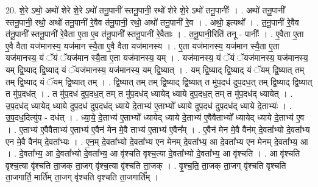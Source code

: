 \documentclass[17pt]{extarticle}
\begin{document}
20. शे॒रे ऽथो॒ अथो॑ शेरे शे॒रे ऽथो॑ तनू॒पानी᳚ स्तनू॒पानी॒ रथो॑ शेरे शे॒रे ऽथो॑ तनू॒पानीः᳚ । . अथो॑ तनू॒पानी᳚ स्तनू॒पानी॒ रथो॒ अथो॑ तनू॒पानी॑ रे॒वैव त॑नू॒पानी॒ रथो॒ अथो॑ तनू॒पानी॑ रे॒व । . अथो॒ इत्यथो᳚ । . त॒नू॒पानी॑ रे॒वैव त॑नू॒पानी᳚ स्तनू॒पानी॑ रे॒वैता ए॒ता ए॒व त॑नू॒पानी᳚ स्तनू॒पानी॑ रे॒वैताः । . त॒नू॒पानी॒रिति॑ तनू - पानीः᳚ । . ए॒वैता ए॒ता ए॒वै वैता यज॑मानस्य॒ यज॑मान स्यै॒ता ए॒वै वैता यज॑मानस्य । . ए॒ता यज॑मानस्य॒ यज॑मान स्यै॒ता ए॒ता यज॑मानस्य॒ यं ॅयं ॅयज॑मान स्यै॒ता ए॒ता यज॑मानस्य॒ यम् । . यज॑मानस्य॒ यं ॅयं ॅयज॑मानस्य॒ यज॑मानस्य॒ यम् द्वि॒ष्याद् द्वि॒ष्याद् यं ॅयज॑मानस्य॒ यज॑मानस्य॒ यम् द्वि॒ष्यात् । . यम् द्वि॒ष्याद् द्वि॒ष्याद् यं ॅयम् द्वि॒ष्यात् तम् तम् द्वि॒ष्याद् यं ॅयम् द्वि॒ष्यात् तम् । . द्वि॒ष्यात् तम् तम् द्वि॒ष्याद् द्वि॒ष्यात् त मु॑प॒दध॑ दुप॒दध॒त् तम् द्वि॒ष्याद् द्वि॒ष्यात् त मु॑प॒दध॑त् । . त मु॑प॒दध॑ दुप॒दध॒त् तम् त मु॑प॒दध॑द् ध्यायेद् ध्याये दुप॒दध॒त् तम् त मु॑प॒दध॑द् ध्यायेत् । . उ॒प॒दध॑द् ध्यायेद् ध्याये दुप॒दध॑ दुप॒दध॑द् ध्याये दे॒ताभ्य॑ ए॒ताभ्यो᳚ ध्याये दुप॒दध॑ दुप॒दध॑द् ध्याये दे॒ताभ्यः॑ । . उ॒प॒दध॒दित्यु॑प - दध॑त् । . ध्या॒ये॒ दे॒ताभ्य॑ ए॒ताभ्यो᳚ ध्यायेद् ध्याये दे॒ताभ्य॑ ए॒वैवैताभ्यो᳚ ध्यायेद् ध्याये दे॒ताभ्य॑ ए॒व । . ए॒ताभ्य॑ ए॒वैवैताभ्य॑ ए॒ताभ्य॑ ए॒वैन॑ मेन मे॒वै ताभ्य॑ ए॒ताभ्य॑ ए॒वैन᳚म् । . ए॒वैन॑ मेन मे॒वै वैन॑म् दे॒वता᳚भ्यो दे॒वता᳚भ्य एन मे॒वै वैन॑म् दे॒वता᳚भ्यः । . ए॒न॒म् दे॒वता᳚भ्यो दे॒वता᳚भ्य एन मेनम् दे॒वता᳚भ्य॒ आ दे॒वता᳚भ्य एन मेनम् दे॒वता᳚भ्य॒ आ । . दे॒वता᳚भ्य॒ आ दे॒वता᳚भ्यो दे॒वता᳚भ्य॒ आ वृ॑श्चति वृश्च॒त्या दे॒वता᳚भ्यो दे॒वता᳚भ्य॒ आ वृ॑श्चति । . आ वृ॑श्चति वृश्च॒त्या वृ॑श्चति ता॒जक् ता॒जग् वृ॑श्च॒त्या वृ॑श्चति ता॒जक् । . वृ॒श्च॒ति॒ ता॒जक् ता॒जग् वृ॑श्चति वृश्चति ता॒जगार्ति॒ मार्ति॑म् ता॒जग् वृ॑श्चति वृश्चति ता॒जगार्ति᳚म् । \newline
\end{document}
